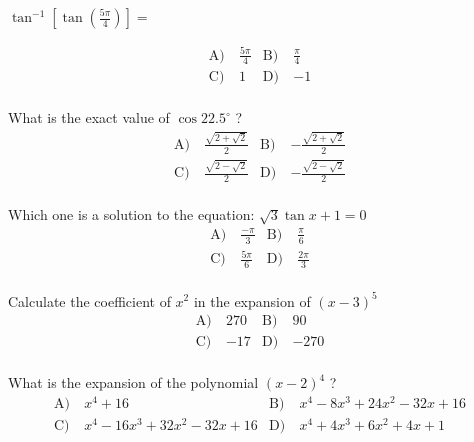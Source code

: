 \begin{problem}\label{PreCal-21}
$\tan ^{-1}\left[\tan \left(\frac{5 \pi}{4}\right)\right]=$

\begin{align*}
\text{A)}\ & \frac{5 \pi}{4} &
\text{B)}\ & \frac{\pi}{4} \\
\text{C)}\ &  1 &
\text{D)}\ & -1 \\
\end{align*}    
\end{problem}


\begin{problem}\label{PreCal-22}
What is the exact value of $\cos 22.5^{\circ}$ ?
\begin{align*}
\text{A)}\ & \frac{\sqrt{2+\sqrt{2}}}{2}  &
\text{B)}\ & -\frac{\sqrt{2+\sqrt{2}}}{2} \\
\text{C)}\ &  \frac{\sqrt{2-\sqrt{2}}}{2} &
\text{D)}\ & -\frac{\sqrt{2-\sqrt{2}}}{2}\\
\end{align*}    
\end{problem}


\begin{problem}\label{PreCal-24}
Which one is a solution to the equation: $\sqrt{3} \tan x+1=0$
\begin{align*}
\text{A)}\ & \frac{-\pi}{3} &
\text{B)}\ &  \frac{\pi}{6}\\
\text{C)}\ &  \frac{5 \pi}{6} &
\text{D)}\ & \frac{2 \pi}{3}\\
\end{align*}    
\end{problem}


\begin{problem}\label{PreCal-25}
Calculate the coefficient of $x^2$ in the expansion of  
$(x-3)^{5}$
\begin{align*}
\text{A)}\ & 270 &
\text{B)}\ & 90 \\
\text{C)}\ & -17  &
\text{D)}\ & -270\\
\end{align*}    
\end{problem}

\begin{problem}\label{PreCal-26}
What is the expansion of the polynomial $(x-2)^{4}$ ?
\begin{align*}
\text{A)}\ & x^{4}+16  &
\text{B)}\ & x^{4}-8 x^{3}+24 x^{2}-32 x+16 \\
\text{C)}\ &  x^{4}-16 x^{3}+32 x^{2}-32 x+16 &
\text{D)}\ & x^{4}+4 x^{3}+6 x^{2}+4 x+1\\
\end{align*}    
\end{problem}


